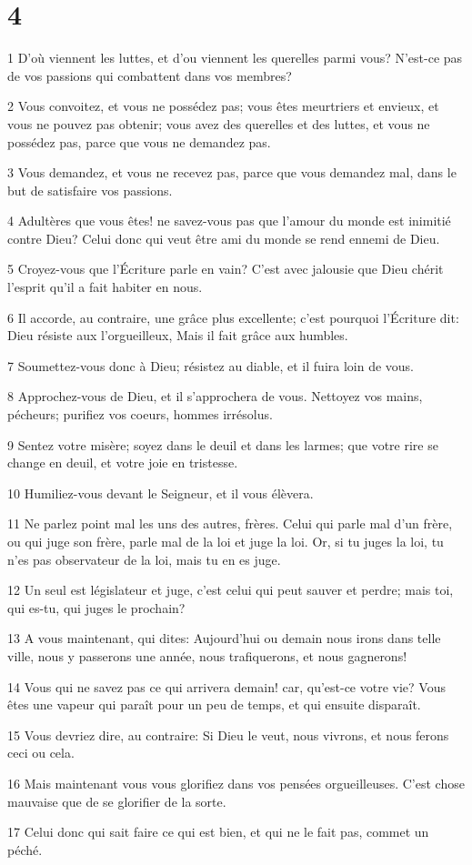 \chapter{4}

\par 1 D'où viennent les luttes, et d'ou viennent les querelles parmi vous? N'est-ce pas de vos passions qui combattent dans vos membres?
\par 2 Vous convoitez, et vous ne possédez pas; vous êtes meurtriers et envieux, et vous ne pouvez pas obtenir; vous avez des querelles et des luttes, et vous ne possédez pas, parce que vous ne demandez pas.
\par 3 Vous demandez, et vous ne recevez pas, parce que vous demandez mal, dans le but de satisfaire vos passions.
\par 4 Adultères que vous êtes! ne savez-vous pas que l'amour du monde est inimitié contre Dieu? Celui donc qui veut être ami du monde se rend ennemi de Dieu.
\par 5 Croyez-vous que l'Écriture parle en vain? C'est avec jalousie que Dieu chérit l'esprit qu'il a fait habiter en nous.
\par 6 Il accorde, au contraire, une grâce plus excellente; c'est pourquoi l'Écriture dit: Dieu résiste aux l'orgueilleux, Mais il fait grâce aux humbles.
\par 7 Soumettez-vous donc à Dieu; résistez au diable, et il fuira loin de vous.
\par 8 Approchez-vous de Dieu, et il s'approchera de vous. Nettoyez vos mains, pécheurs; purifiez vos coeurs, hommes irrésolus.
\par 9 Sentez votre misère; soyez dans le deuil et dans les larmes; que votre rire se change en deuil, et votre joie en tristesse.
\par 10 Humiliez-vous devant le Seigneur, et il vous élèvera.
\par 11 Ne parlez point mal les uns des autres, frères. Celui qui parle mal d'un frère, ou qui juge son frère, parle mal de la loi et juge la loi. Or, si tu juges la loi, tu n'es pas observateur de la loi, mais tu en es juge.
\par 12 Un seul est législateur et juge, c'est celui qui peut sauver et perdre; mais toi, qui es-tu, qui juges le prochain?
\par 13 A vous maintenant, qui dites: Aujourd'hui ou demain nous irons dans telle ville, nous y passerons une année, nous trafiquerons, et nous gagnerons!
\par 14 Vous qui ne savez pas ce qui arrivera demain! car, qu'est-ce votre vie? Vous êtes une vapeur qui paraît pour un peu de temps, et qui ensuite disparaît.
\par 15 Vous devriez dire, au contraire: Si Dieu le veut, nous vivrons, et nous ferons ceci ou cela.
\par 16 Mais maintenant vous vous glorifiez dans vos pensées orgueilleuses. C'est chose mauvaise que de se glorifier de la sorte.
\par 17 Celui donc qui sait faire ce qui est bien, et qui ne le fait pas, commet un péché.

